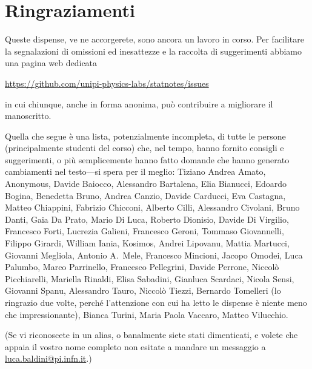 \chapter*{Ringraziamenti}

Queste dispense, ve ne accorgerete, sono ancora un lavoro in corso.
Per facilitare la segnalazioni di omissioni ed inesattezze e la raccolta di
suggerimenti abbiamo una pagina web dedicata
\begin{center}
  \url{https://github.com/unipi-physics-labs/statnotes/issues}
\end{center}
in cui chiunque, anche in forma anonima, può contribuire a migliorare il
manoscritto.

Quella che segue è una lista, potenzialmente incompleta, di tutte le persone
(principalmente studenti del corso) che, nel tempo, hanno fornito consigli e
suggerimenti, o più semplicemente hanno fatto domande che hanno generato
cambiamenti nel testo---si spera per il meglio:
Tiziano Andrea Amato,
Anonymous,
Davide Baiocco,
Alessandro Bartalena,
Elia Bianucci,
Edoardo Bogina,
Benedetta Bruno,
Andrea Canzio,
Davide Carducci,
Eva Castagna,
Matteo Chiappini,
Fabrizio Chicconi,
Alberto Cilli,
Alessandro Civolani,
Bruno Danti,
Gaia Da Prato,
Mario Di Luca,
Roberto Dionisio,
Davide Di Virgilio,
Francesco Forti,
Lucrezia Galieni,
Francesco Geroni,
Tommaso Giovannelli,
Filippo Girardi,
William Iania,
Kosimos,
Andrei Lipovanu,
Mattia Martucci,
Giovanni Megliola,
Antonio A.~Mele,
Francesco Mincioni,
Jacopo Omodei,
Luca Palumbo,
Marco Parrinello,
Francesco Pellegrini,
Davide Perrone,
Niccolò Picchiarelli,
Mariella Rinaldi,
Elisa Sabadini,
Gianluca Scardaci,
Nicola Sensi,
Giovanni Spanu,
Alessandro Tauro,
Niccolò Tiezzi,
Bernardo Tomelleri (lo ringrazio due volte, perché l'attenzione con cui ha
letto le dispense è niente meno che impressionante),
Bianca Turini,
Maria Paola Vaccaro,
Matteo Vilucchio.

\bigskip

(Se vi riconoscete in un alias, o banalmente siete stati dimenticati, e volete
che appaia il vostro nome completo non esitate a mandare un messaggio a
\href{mailto:luca.baldini@pi.infn.it}{luca.baldini@pi.infn.it}.)
